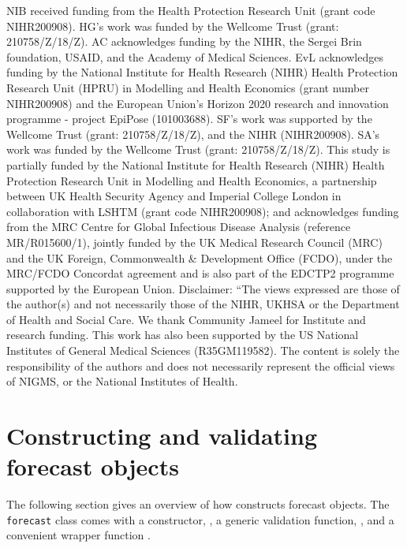\documentclass[
]{jss}
\begin{document}
NIB received funding from the Health Protection Research Unit (grant
code NIHR200908). HG's work was funded by the Wellcome Trust (grant:
210758/Z/18/Z). AC acknowledges funding by the NIHR, the Sergei Brin
foundation, USAID, and the Academy of Medical Sciences. EvL acknowledges
funding by the National Institute for Health Research (NIHR) Health
Protection Research Unit (HPRU) in Modelling and Health Economics (grant
number NIHR200908) and the European Union's Horizon 2020 research and
innovation programme - project EpiPose (101003688). SF's work was
supported by the Wellcome Trust (grant: 210758/Z/18/Z), and the NIHR
(NIHR200908). SA's work was funded by the Wellcome Trust (grant:
210758/Z/18/Z). This study is partially funded by the National Institute
for Health Research (NIHR) Health Protection Research Unit in Modelling
and Health Economics, a partnership between UK Health Security Agency
and Imperial College London in collaboration with LSHTM (grant code
NIHR200908); and acknowledges funding from the MRC Centre for Global
Infectious Disease Analysis (reference MR/R015600/1), jointly funded by
the UK Medical Research Council (MRC) and the UK Foreign, Commonwealth
\& Development Office (FCDO), under the MRC/FCDO Concordat agreement and
is also part of the EDCTP2 programme supported by the European Union.
Disclaimer: ``The views expressed are those of the author(s) and not
necessarily those of the NIHR, UKHSA or the Department of Health and
Social Care. We thank Community Jameel for Institute and research
funding. This work has also been supported by the US National Institutes
of General Medical Sciences (R35GM119582). The content is solely the
responsibility of the authors and does not necessarily represent the
official views of NIGMS, or the National Institutes of Health.



\clearpage

\appendix
\renewcommand\thefigure{\thesection.\arabic{figure}}

\section{Constructing and validating forecast objects}

The following section gives an overview of how 
constructs forecast objects. The \texttt{forecast} class comes with a
constructor, , a generic validation function,
, and a convenient wrapper function
.
\end{document}
